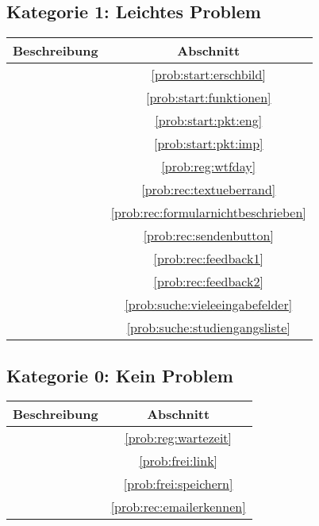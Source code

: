 \subsection*{Kategorie 1: Leichtes Problem}
\begin{tabular}{|p{12cm}|c|}
\hline
\textbf{Beschreibung} & \textbf{Abschnitt} \\
\hline\hline
\nameref{prob:start:erschbild} & \ref{prob:start:erschbild}\\
\nameref{prob:start:funktionen} & \ref{prob:start:funktionen}\\
\nameref{prob:start:pkt:eng} & \ref{prob:start:pkt:eng}\\
\nameref{prob:start:pkt:imp} & \ref{prob:start:pkt:imp}\\
\nameref{prob:reg:wtfday} & \ref{prob:reg:wtfday}\\
\nameref{prob:rec:textueberrand} & \ref{prob:rec:textueberrand}\\
\nameref{prob:rec:formularnichtbeschrieben} & \ref{prob:rec:formularnichtbeschrieben}\\
\nameref{prob:rec:sendenbutton} & \ref{prob:rec:sendenbutton}\\
\nameref{prob:rec:feedback1} & \ref{prob:rec:feedback1}\\
\nameref{prob:rec:feedback2} & \ref{prob:rec:feedback2}\\
\nameref{prob:suche:vieleeingabefelder} & \ref{prob:suche:vieleeingabefelder}\\
\nameref{prob:suche:studiengangsliste} & \ref{prob:suche:studiengangsliste}\\
\hline
\end{tabular}

\subsection*{Kategorie 0: Kein Problem}
\begin{tabular}{|p{12cm}|c|}
\hline
\textbf{Beschreibung} & \textbf{Abschnitt} \\
\hline\hline
\nameref{prob:reg:wartezeit} & \ref{prob:reg:wartezeit}\\
\nameref{prob:frei:link} & \ref{prob:frei:link}\\
\nameref{prob:frei:speichern} & \ref{prob:frei:speichern}\\
\nameref{prob:rec:emailerkennen} & \ref{prob:rec:emailerkennen}\\
\hline
\end{tabular}
